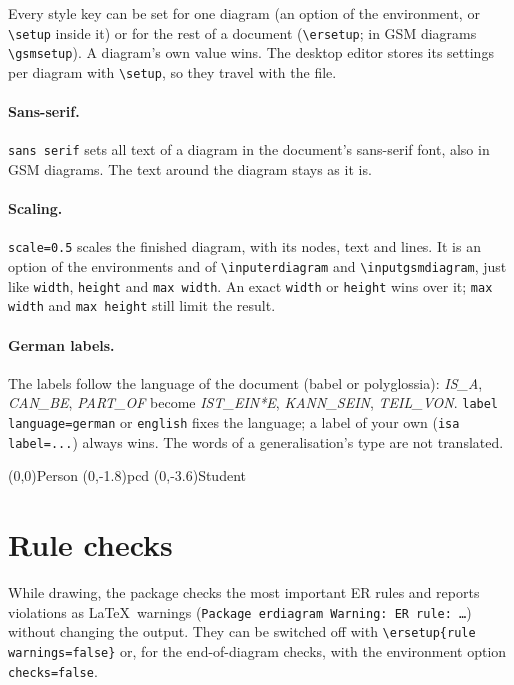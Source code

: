 \documentclass[10pt,a4paper]{article}
\newcommand\cs[1]{\texttt{\textbackslash#1}}
\begin{document}
Every style key can be set for one diagram (an option of the environment, or \cs{setup}
inside it) or for the rest of a document (\cs{ersetup}; in GSM diagrams \cs{gsmsetup}). A
diagram's own value wins. The desktop editor stores its settings per diagram with \cs{setup},
so they travel with the file.

\paragraph{Sans-serif.} \texttt{sans serif} sets all text of a diagram in the document's
sans-serif font, also in GSM diagrams. The text around the diagram stays as it is.

\paragraph{Scaling.} \texttt{scale=0.5} scales the finished diagram, with its nodes, text and
lines. It is an option of the environments and of \cs{inputerdiagram} and \cs{inputgsmdiagram},
just like \texttt{width}, \texttt{height} and \texttt{max width}. An exact \texttt{width} or
\texttt{height} wins over it; \texttt{max width} and \texttt{max height} still limit the result.

\paragraph{German labels.} The labels follow the language of the document (babel or polyglossia):
\emph{IS\_A}, \emph{CAN\_BE}, \emph{PART\_OF} become \emph{IST\_EIN*E}, \emph{KANN\_SEIN},
\emph{TEIL\_VON}. \texttt{label language=german} or \texttt{english} fixes the language; a label
of your own (\texttt{isa label=...}) always wins. The words of a generalisation's type
are not translated.

\begin{example}
\begin{erdiagram}[sans serif, label language=german, scale=0.8]
  (0,0){Person}
  (0,-1.8){p}{cd}
  (0,-3.6){Student}
\end{erdiagram}
\end{example}

\section{Rule checks}\label{sec:rules}

While drawing, the package checks the most important ER rules and
reports violations as \LaTeX\ warnings (\texttt{Package erdiagram
Warning: ER rule: \dots}) without changing the output. They can be
switched off with \verb|\ersetup{rule warnings=false}| or, for the
end-of-diagram checks, with the environment option
\texttt{checks=false}.
\end{document}
